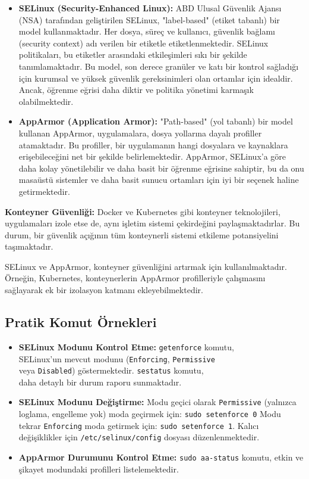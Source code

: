 \begin{itemize}
    \item \textbf{SELinux (Security-Enhanced Linux):} ABD Ulusal Güvenlik Ajansı (NSA) tarafından geliştirilen SELinux, "label-based" (etiket tabanlı) bir model kullanmaktadır. Her dosya, süreç ve kullanıcı, güvenlik bağlamı (security context) adı verilen bir etiketle etiketlenmektedir. SELinux politikaları, bu etiketler arasındaki etkileşimleri sıkı bir şekilde tanımlamaktadır. Bu model, son derece granüler ve katı bir kontrol sağladığı için kurumsal ve yüksek güvenlik gereksinimleri olan ortamlar için idealdir. Ancak, öğrenme eğrisi daha diktir ve politika yönetimi karmaşık olabilmektedir.
    \item \textbf{AppArmor (Application Armor):} "Path-based" (yol tabanlı) bir model kullanan AppArmor, uygulamalara, dosya yollarına dayalı profiller atamaktadır. Bu profiller, bir uygulamanın hangi dosyalara ve kaynaklara erişebileceğini net bir şekilde belirlemektedir. AppArmor, SELinux'a göre daha kolay yönetilebilir ve daha basit bir öğrenme eğrisine sahiptir, bu da onu masaüstü sistemler ve daha basit sunucu ortamları için iyi bir seçenek haline getirmektedir.
\end{itemize}

\textbf{Konteyner Güvenliği:} Docker ve Kubernetes gibi konteyner teknolojileri, uygulamaları izole etse de, aynı işletim sistemi çekirdeğini paylaşmaktadırlar. Bu durum, bir güvenlik açığının tüm konteynerli sistemi etkileme potansiyelini taşımaktadır. 

SELinux ve AppArmor, konteyner güvenliğini artırmak için kullanılmaktadır. Örneğin, Kubernetes, konteynerlerin AppArmor profilleriyle çalışmasını sağlayarak ek bir izolasyon katmanı ekleyebilmektedir.

\subsection{Pratik Komut Örnekleri}

\begin{itemize}
    \item \textbf{SELinux Modunu Kontrol Etme:} \texttt{getenforce} komutu, \\
    SELinux'un mevcut modunu (\texttt{Enforcing}, \texttt{Permissive} \\
    veya \texttt{Disabled}) göstermektedir. \texttt{sestatus} komutu, \\
    daha detaylı bir durum raporu sunmaktadır.
    \item \textbf{SELinux Modunu Değiştirme:} Modu geçici olarak \texttt{Permissive} (yalnızca loglama, engelleme yok) moda geçirmek için: \texttt{sudo setenforce 0} Modu tekrar \texttt{Enforcing} moda getirmek için: \texttt{sudo setenforce 1}. Kalıcı değişiklikler için \texttt{/etc/selinux/config} dosyası düzenlenmektedir.
    \item \textbf{AppArmor Durumunu Kontrol Etme:} \texttt{sudo aa-status} komutu, etkin ve şikayet modundaki profilleri listelemektedir.
\end{itemize}

